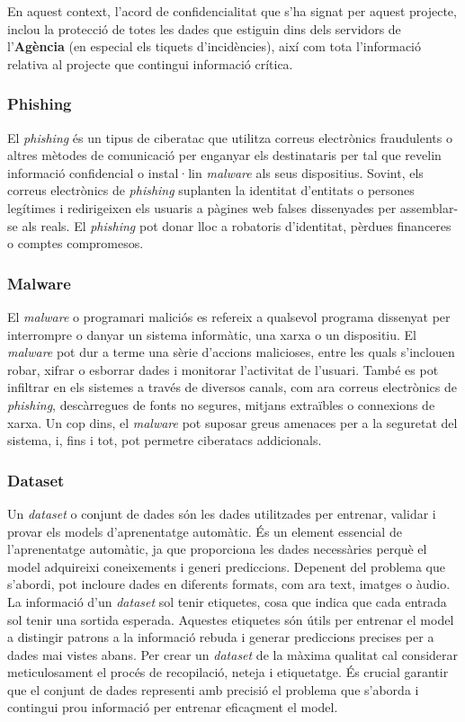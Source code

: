 En aquest context, l'acord de confidencialitat que s'ha signat per aquest projecte, inclou la protecció de totes les dades que estiguin dins dels servidors de l'\textbf{Agència} (en especial els tiquets d'incidències), així com tota l'informació relativa al projecte que contingui informació crítica.

\subsubsection{Phishing}
El \textit{phishing} és un tipus de ciberatac que utilitza correus electrònics fraudulents o altres mètodes de comunicació per enganyar els destinataris per tal que revelin informació confidencial o instal·lin \textit{malware} als seus dispositius. Sovint, els correus electrònics de \textit{phishing} suplanten la identitat d'entitats o persones legítimes i redirigeixen els usuaris a pàgines web falses dissenyades per assemblar-se als reals. El \textit{phishing} pot donar lloc a robatoris d'identitat, pèrdues financeres o comptes compromesos.

\subsubsection{Malware}
El \textit{malware} o programari maliciós es refereix a qualsevol programa dissenyat per interrompre o danyar un sistema informàtic, una xarxa o un dispositiu. El \textit{malware} pot dur a terme una sèrie d'accions malicioses, entre les quals s'inclouen robar, xifrar o esborrar dades i monitorar l'activitat de l'usuari. També es pot infiltrar en els sistemes a través de diversos canals, com ara correus electrònics de \textit{phishing}, descàrregues de fonts no segures, mitjans extraïbles o connexions de xarxa. Un cop dins, el \textit{malware} pot suposar greus amenaces per a la seguretat del sistema, i, fins i tot, pot permetre ciberatacs addicionals.

\subsubsection{Dataset}
Un \textit{dataset} o conjunt de dades són les dades utilitzades per entrenar, validar i provar els models d'aprenentatge automàtic. És un element essencial de l'aprenentatge automàtic, ja que proporciona les dades necessàries perquè el model adquireixi coneixements i generi prediccions. Depenent del problema que s'abordi, pot incloure dades en diferents formats, com ara text, imatges o àudio. La informació d'un \textit{dataset} sol tenir etiquetes, cosa que indica que cada entrada sol tenir una sortida esperada. Aquestes etiquetes són útils per entrenar el model a distingir patrons a la informació rebuda i generar prediccions precises per a dades mai vistes abans. Per crear un \textit{dataset} de la màxima qualitat cal considerar meticulosament el procés de recopilació, neteja i etiquetatge. És crucial garantir que el conjunt de dades representi amb precisió el problema que s'aborda i contingui prou informació per entrenar eficaçment el model.
